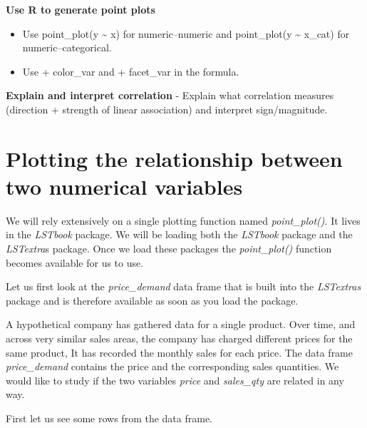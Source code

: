 \documentclass[
  12pt,
  letterpaper,
  DIV=11,
  numbers=noendperiod]{scrreprt}
\providecommand{\tightlist}{%
  \setlength{\itemsep}{0pt}\setlength{\parskip}{0pt}}
\begin{document}
\textbf{Use R to generate point plots}

\begin{itemize}
\tightlist
\item
  Use point\_plot(y \textasciitilde{} x) for numeric--numeric and
  point\_plot(y \textasciitilde{} x\_cat) for numeric--categorical.
\item
  Use + color\_var and + facet\_var in the formula.
\end{itemize}

\textbf{Explain and interpret correlation} - Explain what correlation
measures (direction + strength of linear association) and interpret
sign/magnitude.

\section{Plotting the relationship between two numerical
variables}\label{plotting-the-relationship-between-two-numerical-variables}

We will rely extensively on a single plotting function named
\emph{point\_plot()}. It lives in the \emph{LSTbook} package. We will be
loading both the \emph{LSTbook} package and the \emph{LSTextra}s
package. Once we load these packages the \emph{point\_plot()} function
becomes available for us to use.

Let us first look at the \emph{price\_demand} data frame that is built
into the \emph{LSTextras} package and is therefore available as soon as
you load the package.

A hypothetical company has gathered data for a single product. Over
time, and across very similar sales areas, the company has charged
different prices for the same product, It has recorded the monthly sales
for each price. The data frame \emph{price\_demand} contains the price
and the corresponding sales quantities. We would like to study if the
two variables \emph{price} and \emph{sales\_qty} are related in any way.

First let us see some rows from the data frame.
\end{document}
